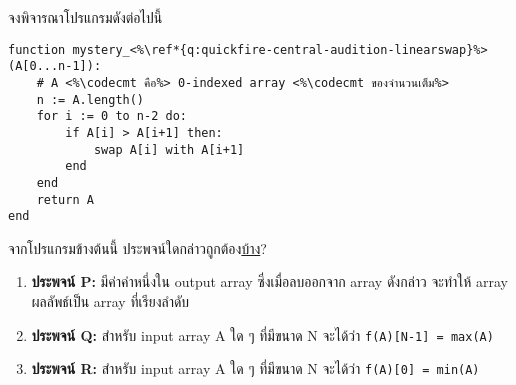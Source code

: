 \question{\label{q:quickfire-central-audition-linearswap}}

จงพิจารณาโปรแกรมดังต่อไปนี้
\begin{lstlisting}
function mystery_<%\ref*{q:quickfire-central-audition-linearswap}%>(A[0...n-1]):
    # A <%\codecmt คือ%> 0-indexed array <%\codecmt ของจำนวนเต็ม%>
    n := A.length()
    for i := 0 to n-2 do:
        if A[i] > A[i+1] then:
            swap A[i] with A[i+1]
        end
    end
    return A
end
\end{lstlisting}

\medskip\noindent
จากโปรแกรมข้างต้นนี้ ประพจน์ใดกล่าวถูกต้อง\uline{บ้าง}?

\begin{enumerate}[label={$\square$}]
    \item \textbf{ประพจน์ P:} มีค่าค่าหนึ่งใน output array ซึ่งเมื่อลบออกจาก array ดังกล่าว จะทำให้ array ผลลัพธ์เป็น array ที่เรียงลำดับ
    \item \textbf{ประพจน์ Q:} สำหรับ input array A ใด ๆ ที่มีขนาด N จะได้ว่า \lstinline{f(A)[N-1] = max(A)}
    \item \textbf{ประพจน์ R:} สำหรับ input array A ใด ๆ ที่มีขนาด N จะได้ว่า \lstinline{f(A)[0] = min(A)}
\end{enumerate}
